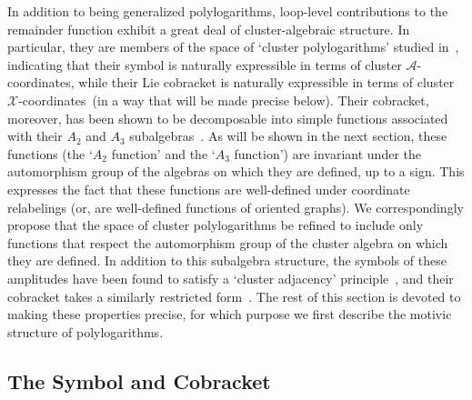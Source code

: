 \documentclass[11pt]{article}
\def\x{\mathcal{X}}
\def\xcoords{$\mathcal{X}$-coordinates}
\def\a{\mathcal{A}}
\def\acoords{$\mathcal{A}$-coordinates}
\def\bb2{B_2\wedge B_2}
\def\b3c{B_3 \otimes \mathbb{C}^*}
\begin{document}
In addition to being generalized polylogarithms, loop-level contributions to the remainder function exhibit a great deal of cluster-algebraic structure. In particular, they are members of the space of `cluster polylogarithms' studied in~\cite{Golden:2014xqa}, indicating that their symbol is naturally expressible in terms of cluster \acoords, while their Lie cobracket is naturally expressible in terms of cluster \xcoords\ (in a way that will be made precise below). Their cobracket, moreover, has been shown to be decomposable into simple functions associated with their $A_2$ and $A_3$ subalgebras~\cite{Golden:2014xqa}. As will be shown in the next section, these functions (the `$A_2$ function' and the `$A_3$ function') are invariant under the automorphism group of the algebras on which they are defined, up to a sign. This expresses the fact that these functions are well-defined under coordinate relabelings (or, are well-defined functions of oriented graphs). We correspondingly propose that the space of cluster polylogarithms be refined to include only functions that respect the automorphism group of the cluster algebra on which they are defined. In addition to this subalgebra structure, the symbols of these amplitudes have been found to satisfy a `cluster adjacency' principle~\cite{Drummond:2017ssj}, and their cobracket takes a similarly restricted form~\cite{Golden:2014xqf}. The rest of this section is devoted to making these properties precise, for which purpose we first describe the motivic structure of polylogarithms. 

\subsection{The Symbol and Cobracket} \label{sec:coproduct}


\end{document}

